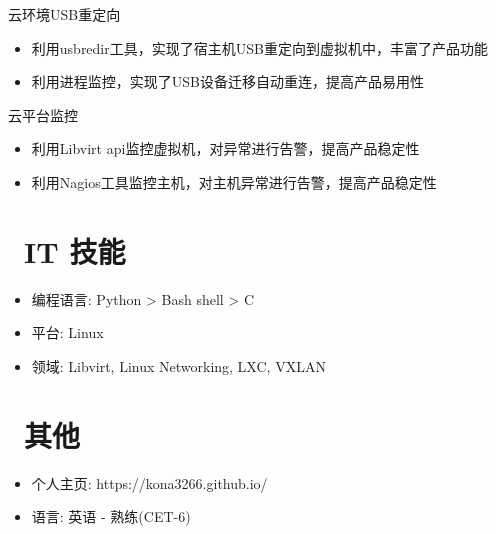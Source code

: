 \documentclass{resume}
\begin{document}
\begin{onehalfspacing}
云环境USB重定向
\begin{itemize}
  \item 利用usbredir工具，实现了宿主机USB重定向到虚拟机中，丰富了产品功能
  \item 利用进程监控，实现了USB设备迁移自动重连，提高产品易用性
\end{itemize}
\end{onehalfspacing}
\begin{onehalfspacing}
云平台监控
\begin{itemize}
  \item 利用Libvirt api监控虚拟机，对异常进行告警，提高产品稳定性
  \item 利用Nagios工具监控主机，对主机异常进行告警，提高产品稳定性
\end{itemize}
\end{onehalfspacing}


\section{\faCogs\ IT 技能}
\begin{itemize}[parsep=0.5ex]
  \item 编程语言: Python > Bash shell > C
  \item 平台: Linux
  \item 领域: Libvirt, Linux Networking, LXC, VXLAN
\end{itemize}

\section{\faInfo\ 其他}
\begin{itemize}[parsep=0.5ex]
  \item 个人主页: https://kona3266.github.io/
  \item 语言: 英语 - 熟练(CET-6)
\end{itemize}

%
%
\end{document}
